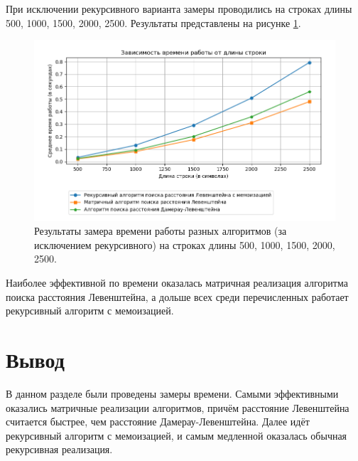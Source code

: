 При исключении рекурсивного варианта замеры проводились на строках длины 500, 1000, 1500, 2000, 2500. Результаты представлены на рисунке \ref{fig:res2}.

\begin{figure}[h!]
	\centering
	\includegraphics[width=1\textwidth]{tex_parts/research2.png}
	\caption{\label{fig:res2} Результаты замера времени работы разных алгоритмов (за исключением рекурсивного) на строках длины 500, 1000, 1500, 2000, 2500.}
\end{figure}

Наиболее эффективной по времени оказалась матричная реализация алгоритма поиска расстояния Левенштейна, а дольше всех среди перечисленных работает рекурсивный алгоритм с мемоизацией.

\section{Вывод}

В данном разделе были проведены замеры времени. Самыми эффективными оказались матричные реализации алгоритмов, причём расстояние Левенштейна считается быстрее, чем расстояние Дамерау-Левенштейна. Далее идёт рекурсивный алгоритм с мемоизацией, и самым медленной оказалась обычная рекурсивная реализация.

